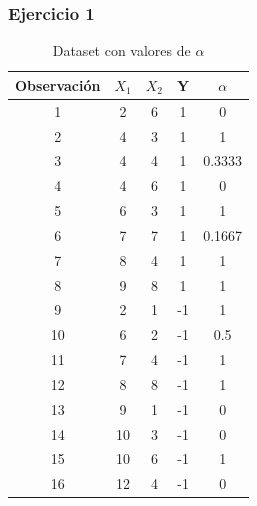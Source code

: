 \documentclass[11pt]{article}
\begin{document}
\subsubsection*{Ejercicio 1}

\begin{table}[H]
\centering
\begin{tabular}{ccccc}
\toprule
Observación & $X_1$ & $X_2$ & Y & $\alpha$ \\
\toprule
1 & 2 & 6 & 1 & 0 \\
2 & 4 & 3 & 1 & 1 \\
3 & 4 & 4 & 1 & 0.3333 \\
4 & 4 & 6 & 1 & 0 \\
5 & 6 & 3 & 1 & 1 \\
6 & 7 & 7 & 1 & 0.1667 \\
7 & 8 & 4 & 1 & 1 \\
8 & 9 & 8 & 1 & 1 \\
9 & 2 & 1 & -1 & 1 \\
10 & 6 & 2 & -1 & 0.5 \\
11 & 7 & 4 & -1 & 1 \\
12 & 8 & 8 & -1 & 1 \\
13 & 9 & 1 & -1 & 0 \\
14 & 10 & 3 & -1 & 0 \\
15 & 10 & 6 & -1 & 1 \\
16 & 12 & 4 & -1 & 0 \\
\toprule
\end{tabular}
\caption{Dataset con valores de $\alpha$}
\label{tab:dataset_alpha}
\end{table}
\end{document}
